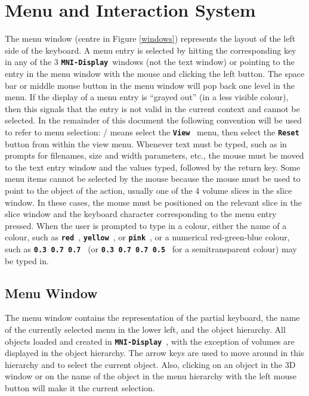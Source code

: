 \documentclass{article}
\newcommand{\ident}[1]{{\bf\tt #1}\ }
\newcommand{\display}{\ident{MNI-Display}}
\newcommand{\menutwo}[2]{{\scriptsize \fbox{\bf #1}/\fbox{\bf #2}}}
\begin{document}
\section{Menu and Interaction System}

The menu window (centre in Figure \ref{windows}) represents the layout
of the left side of the keyboard.  A menu entry is selected by hitting the
corresponding key in any of the 3 \display windows (not the text window)
or pointing to the entry
in the menu window with the mouse and clicking the left button.
The space bar or middle mouse
button in the menu window will pop back one level in the menu.  If the
display of a menu
entry is ``grayed out'' (in a less visible colour), then this signals that the
entry is not valid in the current context and cannot be selected.  In the
remainder of this document
the following convention will be used to refer to menu selection:
\menutwo{View}{Reset} means select the \ident{View} menu, then
select the \ident{Reset} button
from within the view menu.  Whenever text must be typed, such as in prompts
for filenames, size and width parameters, etc., the mouse must be moved to the
text entry window and the values typed, followed by the return key.
Some menu items cannot be selected by the mouse because the mouse must be
used to point to the object of the action, usually one of the 4 volume slices
in the slice window.
In these cases, the mouse must be positioned on the relevant slice in
the slice window and the
keyboard character corresponding to the menu entry pressed.
When the user is prompted to type in a colour, either the name of a colour,
such as \ident{red}, \ident{yellow}, or \ident{pink}, or a numerical
red-green-blue colour,
such as \mbox{\ident{0.3 0.7 0.7}} (or \mbox{\ident{0.3 0.7 0.7 0.5}} for
a semitransparent colour) may be typed in.

\subsection{Menu Window}

The menu window contains the representation of the partial keyboard, 
the name of the currently selected menu in the lower left, and
the object hierarchy.  All objects loaded and created in \display,
with the exception of volumes are displayed in the object hierarchy.  The
arrow keys are used to move around in this hierarchy and to select the
current object.  Also, clicking on an object in the 3D window or on the
name of the object in the menu hierarchy with the left mouse button
will make it the current selection.
\end{document}
